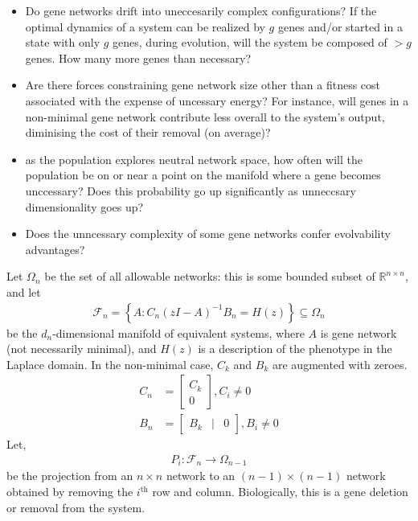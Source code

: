 \documentclass[11 pt]{article}
\newcommand{\R}{\mathbb{R}}
\newcommand{\1}{\mathbbm{1}}
\begin{document}
  \begin{itemize}
    \item Do gene networks drift into uneccesarily complex configurations? If the optimal dynamics of a system can be realized by $g$ genes and/or started in a state with only $g$ genes, during evolution, will the system be composed of $> g$ genes. How many more genes than necessary? 
    \item Are there forces constraining gene network size other than a fitness cost associated with the expense of uncessary energy? For instance, will genes in a non-minimal gene network contribute less overall to the system's output, diminising the cost of their removal (on average)? 
    \item as the population explores neutral network space, how often will the population be on or near a point on the manifold where a gene becomes unccessary? Does this probability go up significantly as unneccsary dimensionality goes up?
    \item Does the unncessary complexity of some gene networks confer evolvability advantages? 
  \end{itemize}

Let $\Omega_n$ be the set of all allowable networks: this is some bounded subset of $\R^{n \times n}$,
and let
  \begin{align*}
    \mathcal{F}_{n} = \left\{ A : C_{n}(zI-A)^{-1} B_{n} = H(z) \right\} \subseteq \Omega_n
  \end{align*}
be the $d_n$-dimensional manifold of equivalent systems, 
where $A$ is gene network (not necessarily minimal), and $H(z)$ is a description of the phenotype in the Laplace domain. In the non-minimal case, $C_{k}$ and $B_{k}$ are augmented with zeroes.
  \begin{align*}
    C_{n} &= \left[ \begin{array}{cc} C_{k}  \\ \hline 0 \end{array} \right], C_{i} \neq 0 \\
      B_{n} &= \left[ \begin{array}{ccc} B_{k} & \vert & 0 \end{array} \right], B_{i} \neq 0
  \end{align*}
Let, 
  \begin{align*}
        P_{i} : \mathcal{F}_{n} \rightarrow \Omega_{n-1}
  \end{align*}
be the projection from an $n \times n$ network to an $(n-1) \times (n-1)$ network
obtained by removing the $i^\text{th}$ row and column. 
Biologically, this is a gene deletion or removal from the system.
\end{document}
